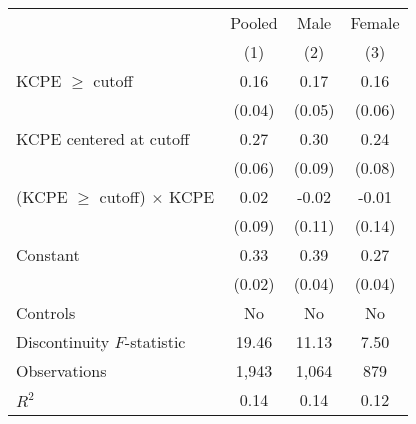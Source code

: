 \begin{tabular}{@{}l*{3}{c}}
\toprule \toprule
  &  Pooled & Male & Female \\
  & (1)  & (2) & (3) \\ 
\toprule
\addlinespace
KCPE $\geq$ cutoff  &        0.16\sym{***}&        0.17\sym{***}&        0.16\sym{***}\\
                    &      (0.04)         &      (0.05)         &      (0.06)         \\
\addlinespace
KCPE centered at cutoff&        0.27\sym{***}&        0.30\sym{***}&        0.24\sym{***}\\
                    &      (0.06)         &      (0.09)         &      (0.08)         \\
\addlinespace
(KCPE $\geq$ cutoff) $\times$ KCPE&        0.02         &       -0.02         &       -0.01         \\
                    &      (0.09)         &      (0.11)         &      (0.14)         \\
\addlinespace
Constant            &        0.33\sym{***}&        0.39\sym{***}&        0.27\sym{***}\\
                    &      (0.02)         &      (0.04)         &      (0.04)         \\
\addlinespace
Controls            &          No         &          No         &          No         \\
Discontinuity \(F\)-statistic&       19.46         &       11.13         &        7.50         \\
Observations        &       1,943         &       1,064         &         879         \\
\(R^2\)             &        0.14         &        0.14         &        0.12         \\
\bottomrule \bottomrule \end{tabular}
